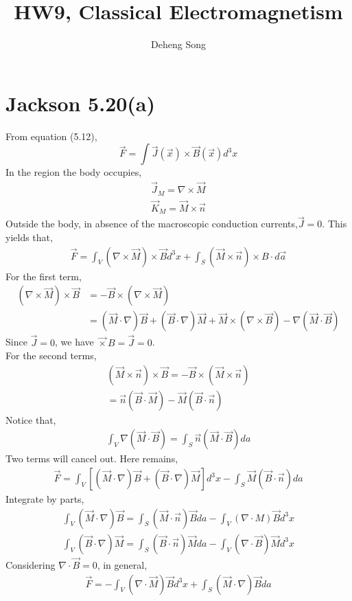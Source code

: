 \documentclass{article}
\begin{document}
\title{HW9, Classical Electromagnetism}
\author{Deheng Song}
\maketitle
\section*{Jackson 5.20(a)}

From equation (5.12),
\[ \vec F=\int \vec J(\vec x)\times\vec B(\vec x)d^3x \]
In the region the body occupies,
\begin{align*}
  \vec J_M=\nabla\times\vec M\\
  \vec K_M =\vec M\times\vec n
\end{align*}
Outside the body, in absence of the macroscopic conduction currents,$ \vec J=0$.
This yields that,
\begin{align*}
  \vec F=\int_V(\nabla\times\vec M)\times\vec Bd^3x+\int_S(\vec M\times \vec n)\times B\cdot d\vec a 
\end{align*}
For the first term,
\begin{align*}
  (\nabla\times\vec M)\times\vec B&=-\vec B\times(\nabla\times\vec M)\\
                                  &=(\vec M\cdot\nabla)\vec B+(\vec B\cdot\nabla)\vec M+\vec M\times(\nabla\times\vec B)-\nabla(\vec M\cdot\vec B)
\end{align*}
Since $\vec J=0$, we have $\vec\times B=\vec J=0$.\\
For the second terms,
\begin{align*}
  (\vec M\times\vec n)\times\vec B=-\vec B\times(\vec M\times\vec n) \\
  =\vec n(\vec B\cdot\vec M)-\vec M(\vec B\cdot\vec n)
\end{align*}
Notice that,
\begin{align*}
  \int_V\nabla(\vec M\cdot\vec B)=\int_S\vec n(\vec M\cdot\vec B)da
\end{align*}
Two terms will cancel out. Here remains,
\begin{align*}
  \vec F=\int_V[(\vec M\cdot\nabla)\vec B+(\vec B\cdot\nabla)\vec M]d^3x-\int_S\vec M(\vec B\cdot\vec n)da
\end{align*}
Integrate by parts,
\begin{align*}
  \int_V(\vec M\cdot\nabla)\vec B=\int_S(\vec M\cdot\vec n)\vec B da-\int_V(\nabla\cdot M)\vec B d^3x
\end{align*}
\begin{align*}
  \int_V(\vec B\cdot\nabla)\vec M=\int_S(\vec B\cdot\vec n)\vec M da-\int_V(\nabla\cdot\vec B)\vec M d^3x
\end{align*}
Considering $\nabla\cdot\vec B=0$, in general,
\begin{align*}
  \vec F=-\int_V(\nabla\cdot\vec M)\vec B d^3x+\int_S(\vec M\cdot\nabla)\vec Bda
\end{align*}
\pagebreak
\end{document}
